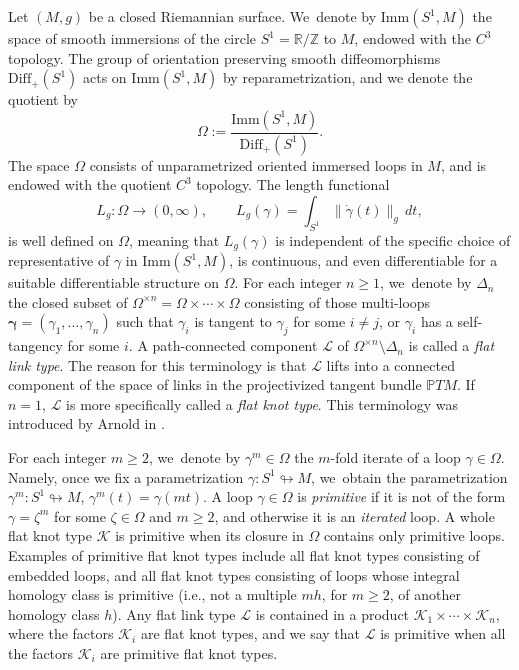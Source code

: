 \documentclass[11pt]{article}
\newcommand{\ie}{i.e.,\xspace}
\let\bm\boldsymbol
\newcommand{\Z}{\mathbb{Z}}
\newcommand{\R}{\mathbb{R}}
\newcommand{\PP}{\mathbb{P}}
\newcommand{\KK}{\mathcal{K}}
\newcommand{\LL}{\mathcal{L}}
\newcommand{\Diff}{\mathrm{Diff}}
\newcommand{\Imm}{\mathrm{Imm}}
\theoremstyle{plain}
\theoremstyle{definition}
\begin{document}
Let $(M,g)$ be a closed Riemannian surface. We~denote by $\Imm(S^1,M)$ the space of smooth immersions of the circle $S^1=\R/\Z$ to $M$, endowed with the $C^3$ topology. The group of orientation preserving smooth diffeomorphisms $\Diff_+(S^1)$ acts on $\Imm(S^1,M)$ by reparametrization, and we denote the quotient by
\[
\Omega:=\frac{\Imm(S^1,M)}{\Diff_+(S^1)}.
\]
The space $\Omega$ consists of unparametrized oriented immersed loops in $M$, and is endowed with the quotient $C^3$ topology.
The length functional
\[
L_g:\Omega\to(0,\infty),\qquad L_g(\gamma)=\int_{S^1} \|\dot\gamma(t)\|_g\,dt,
\]
is well defined on $\Omega$, meaning that $L_g(\gamma)$ is independent of the specific choice of representative of $\gamma$ in $\Imm(S^1,M)$, is continuous, and even differentiable for a suitable differentiable structure on $\Omega$.
For each integer $n\geq1$, we~denote by $\Delta_n$ the closed subset of $\Omega^{\times n}=\Omega\times\cdots\times\Omega$ consisting of those multi-loops $\bm\gamma=(\gamma_1,\dots,\gamma_n)$ such that $\gamma_i$ is tangent to $\gamma_j$ for some $i\neq j$, or $\gamma_i$ has a self-tangency for some $i$.
A path-connected component $\LL$ of $\Omega^{\times n}\setminus\Delta_n$ is called a \emph{flat link type}. The reason for this terminology is that $\LL$ lifts into a connected component of the space of links in the projectivized tangent bundle $\PP TM$. If $n=1$, $\LL$ is more specifically called a \emph{flat knot type}. This terminology was introduced by Arnold in \cite{Arnold:1994aa}.

For each integer $m\geq2$, we~denote by $\gamma^m\in\Omega$ the $m$-fold iterate of a loop $\gamma\in\Omega$. Namely, once we fix a parametrization $\gamma:S^1\looparrowright M$, we~obtain the parametrization $\gamma^m:S^1\looparrowright M$, $\gamma^m(t)=\gamma(mt)$.
A loop $\gamma\in\Omega$ is \emph{primitive} if it is not of the form $\gamma=\zeta^m$ for some $\zeta\in\Omega$ and $m\geq2$, and otherwise it is an \emph{iterated} loop.
A whole flat knot type $\KK$ is primitive when its closure in $\Omega$ contains only primitive loops. Examples of primitive flat knot types include all flat knot types consisting of embedded loops, and all flat knot types consisting of loops whose integral homology class is primitive (\ie not a multiple $mh$, for $m\geq2$, of another homology class $h$). Any flat link type $\LL$ is contained in a product $\KK_1\times\cdots\times\KK_n$, where the factors $\KK_i$ are flat knot types, and we say that $\LL$ is primitive when all the factors $\KK_i$ are primitive flat knot types.
\end{document}
